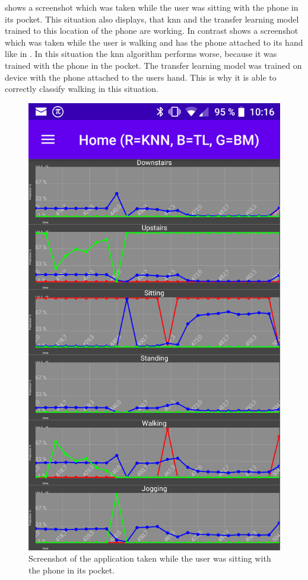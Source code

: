  shows a screenshot which was taken while the user was sitting with the phone in its pocket. This situation also displays, that \gls{knn} and the transfer learning model trained to this location of the phone are working. In contrast  shows a screenshot which was taken while the user is walking and has the phone attached to its hand like in . In this situation the \gls{knn} algorithm performs worse, because it was trained with the phone in the pocket. The transfer learning model was trained on device with the phone attached to the users hand. This is why it is able to correctly classify walking in this situation.
\begin{figure}[htpb]
\centering
\includegraphics[width=\linewidth]{sitting}
\caption{Screenshot of the application taken while the user was sitting with the phone in its pocket.}
\label{myfig:sitting}
\end{figure}
